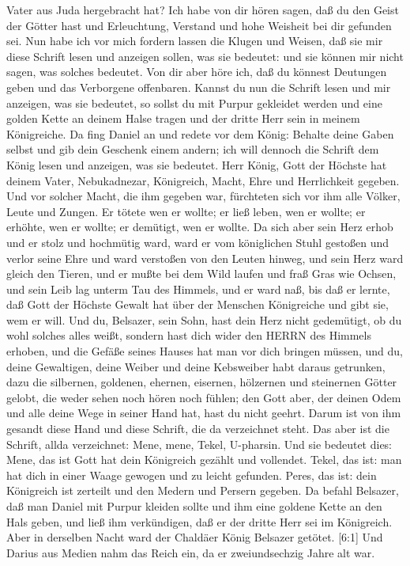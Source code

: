 Vater aus Juda hergebracht hat?  Ich habe von dir hören
sagen, daß du den Geist der Götter hast und Erleuchtung, Verstand und
hohe Weisheit bei dir gefunden sei.  Nun habe ich vor mich
fordern lassen die Klugen und Weisen, daß sie mir diese Schrift lesen
und anzeigen sollen, was sie bedeutet: und sie können mir nicht sagen,
was solches bedeutet.  Von dir aber höre ich, daß du
könnest Deutungen geben und das Verborgene offenbaren. Kannst du nun die
Schrift lesen und mir anzeigen, was sie bedeutet, so sollst du mit
Purpur gekleidet werden und eine golden Kette an deinem Halse tragen und
der dritte Herr sein in meinem Königreiche.  Da fing Daniel
an und redete vor dem König: Behalte deine Gaben selbst und gib dein
Geschenk einem andern; ich will dennoch die Schrift dem König lesen und
anzeigen, was sie bedeutet.  Herr König, Gott der Höchste
hat deinem Vater, Nebukadnezar, Königreich, Macht, Ehre und Herrlichkeit
gegeben.  Und vor solcher Macht, die ihm gegeben war,
fürchteten sich vor ihm alle Völker, Leute und Zungen. Er tötete wen er
wollte; er ließ leben, wen er wollte; er erhöhte, wen er wollte; er
demütigt, wen er wollte.  Da sich aber sein Herz erhob und
er stolz und hochmütig ward, ward er vom königlichen Stuhl gestoßen und
verlor seine Ehre  und ward verstoßen von den Leuten
hinweg, und sein Herz ward gleich den Tieren, und er mußte bei dem Wild
laufen und fraß Gras wie Ochsen, und sein Leib lag unterm Tau des
Himmels, und er ward naß, bis daß er lernte, daß Gott der Höchste Gewalt
hat über der Menschen Königreiche und gibt sie, wem er will.
 Und du, Belsazer, sein Sohn, hast dein Herz nicht
gedemütigt, ob du wohl solches alles weißt,  sondern hast
dich wider den HERRN des Himmels erhoben, und die Gefäße seines Hauses
hat man vor dich bringen müssen, und du, deine Gewaltigen, deine Weiber
und deine Kebsweiber habt daraus getrunken, dazu die silbernen,
goldenen, ehernen, eisernen, hölzernen und steinernen Götter gelobt, die
weder sehen noch hören noch fühlen; den Gott aber, der deinen Odem und
alle deine Wege in seiner Hand hat, hast du nicht geehrt. 
Darum ist von ihm gesandt diese Hand und diese Schrift, die da
verzeichnet steht.  Das aber ist die Schrift, allda
verzeichnet: Mene, mene, Tekel, U-pharsin.  Und sie
bedeutet dies: Mene, das ist Gott hat dein Königreich gezählt und
vollendet.  Tekel, das ist: man hat dich in einer Waage
gewogen und zu leicht gefunden.  Peres, das ist: dein
Königreich ist zerteilt und den Medern und Persern gegeben.
 Da befahl Belsazer, daß man Daniel mit Purpur kleiden
sollte und ihm eine goldene Kette an den Hals geben, und ließ ihm
verkündigen, daß er der dritte Herr sei im Königreich. 
Aber in derselben Nacht ward der Chaldäer König Belsazer getötet.
 {[}6:1{]} Und Darius aus Medien nahm das Reich ein, da er
zweiundsechzig Jahre alt war.

